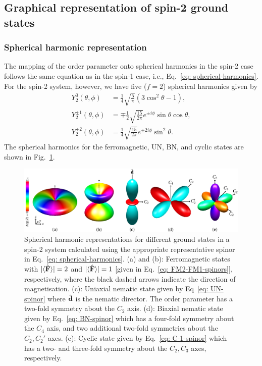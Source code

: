 \subsection{Graphical representation of spin-2 ground states}
\subsubsection{Spherical harmonic representation}
The mapping of the order parameter onto spherical harmonics in the spin-2 case
follows the same equation as in the spin-1 case, i.e.,
Eq.~\eqref{eq: spherical-harmonics}.
For the spin-2 system, however, we have five (\(f=2\)) spherical harmonics given
by
\begin{align}
    Y_2^0(\theta, \phi)       & = \frac{1}{4}\sqrt{\frac{5}{\pi}}
    (3\cos^2\theta - 1),                                                    \\
    Y_2^{\pm 1}(\theta, \phi) & =
    \mp \frac{1}{2}\sqrt{\frac{15}{2\pi}}e^{\pm i\phi}\sin\theta\cos\theta, \\
    Y_2^{\pm 2}(\theta, \phi) & =
    \frac{1}{4}\sqrt{\frac{15}{2\pi}}e^{\pm 2i\phi}\sin^2\theta.
\end{align}
The spherical harmonics for the ferromagnetic, UN, BN, and cyclic states
are shown in Fig.~\ref{fig: spin-2-spherical-harmonics}.
\begin{figure}
    \centering
    \includegraphics[width=\textwidth]
    {gfx/ch-groundStateSymmetries/spin-2-ground-states.pdf}
    \caption[Spherical harmonic representation of spin-2 ground states]
    {\label{fig: spin-2-spherical-harmonics}Spherical harmonic
        representations for different ground states in a spin-2 system
        calculated using the appropriate representative spinor in
        Eq.~\eqref{eq: spherical-harmonics}.
        (a) and (b): Ferromagnetic states with \(|\langle \hat{\vb{F}} \rangle |=2\) and
        \(|\langle \hat{\vb{F}} \rangle |=1\) [given in Eq.~\eqref{eq: FM2-FM1-spinors}], respectively,
        where the black dashed arrows indicate the direction of magnetisation.
        (c): Uniaxial nematic state given by Eq~\eqref{eq: UN-spinor} where
        \(\hat{\vb{d}}\) is the nematic director.
        The order parameter has a two-fold symmetry about the \(C_2\) axis.
        (d): Biaxial nematic state given by Eq.~\eqref{eq: BN-spinor} which
        has a four-fold symmetry about the \(C_4\) axis, and two additional
        two-fold symmetries about the \(C_2, C_2'\) axes.
        (e): Cyclic state given by Eq.~\eqref{eq: C-1-spinor} which has a
        two- and three-fold symmetry about the \(C_2, C_3\) axes, respectively.}
\end{figure}
